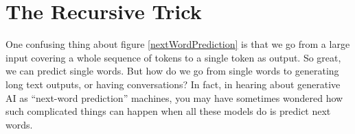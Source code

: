 

  
\section{The Recursive Trick}\label{recursiveTrick}

One confusing thing about figure \ref{nextWordPrediction} is that we go from a
large input covering a whole sequence of tokens to a single token as output. So
great, we can predict single words. But how do we go from single words to
generating long text outputs, or having conversations? In fact, in hearing
about generative AI as ``next-word prediction'' machines, you may have
sometimes wondered how such complicated things can happen when all these models
do is predict next words.

